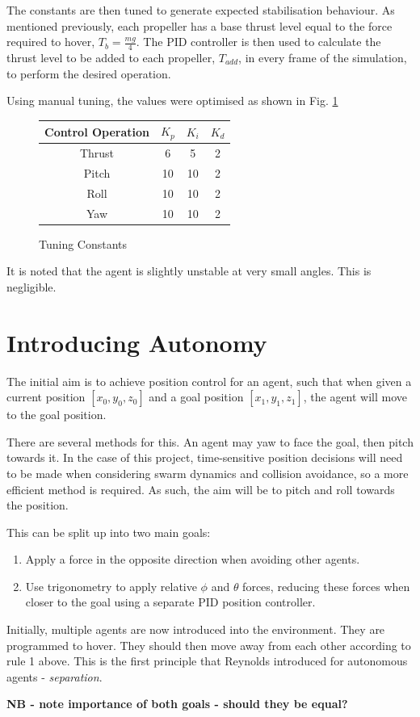 \documentclass{article}
\begin{document}
The constants are then tuned to generate expected stabilisation behaviour. As mentioned previously, each propeller has a base thrust level equal to the force required to hover, $T_b = \frac{mg}{4}$. The PID controller is then used to calculate the thrust level to be added to each propeller, $T_{add}$, in every frame of the simulation, to perform the desired operation.

Using manual tuning, the values were optimised as shown in Fig. \ref{fig:pid-tuning}

\begin{figure}[H]
    \centering
        \begin{tabular}{| c | c | c | c |} 
        \hline
        Control Operation & $K_p$ & $K_i$ & $K_d$ \\ 
        \hline
        Thrust & 6 & 5 & 2 \\
        \hline
        Pitch & 10 & 10 & 2 \\
        \hline
        Roll & 10 & 10 & 2 \\
        \hline
        Yaw & 10 & 10 & 2 \\
        \hline
        \end{tabular}
        \caption{Tuning Constants}
        \label{fig:pid-tuning}
\end{figure}

It is noted that the agent is slightly unstable at very small angles. This is negligible.

\section{Introducing Autonomy}
The initial aim is to achieve position control for an agent, such that when given a current position $[x_0,y_0,z_0]$ and a goal position $[x_1,y_1,z_1]$, the agent will move to the goal position.

There are several methods for this. An agent may yaw to face the goal, then pitch towards it. In the case of this project, time-sensitive position decisions will need to be made when considering swarm dynamics and collision avoidance, so a more efficient method is required. As such, the aim will be to pitch and roll towards the position.

This can be split up into two main goals:
\begin{enumerate}
    \item Apply a force in the opposite direction when avoiding other agents.
    \item Use trigonometry to apply relative $\phi$ and $\theta$ forces, reducing these forces when closer to the goal using a separate PID position controller.
\end{enumerate}

Initially, multiple agents are now introduced into the environment. They are programmed to hover. They should then move away from each other according to rule 1 above. This is the first principle that Reynolds \cite{Reynolds} introduced for autonomous agents - \emph{separation}.

\textbf{NB - note importance of both goals - should they be equal?}




 
\end{document}
